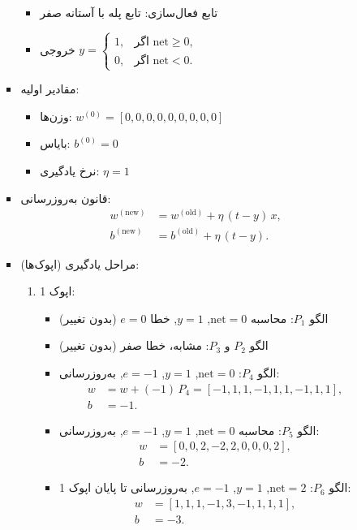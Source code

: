\begin{enumerate}
\begin{enumerate}
\begin{itemize}
\begin{itemize}
				\item تابع فعال‌سازی: تابع پله با آستانه صفر
				\item خروجی $y=\begin{cases}1,&\text{اگر }\mathrm{net}\ge0,\\0,&\text{اگر }\mathrm{net}<0.\end{cases}$
			\end{itemize}
			\item مقادیر اولیه:
			\begin{itemize}
				\item وزن‌ها: $w^{(0)}=[0,0,0,0,0,0,0,0,0]$
				\item بایاس: $b^{(0)}=0$
				\item نرخ یادگیری: $\eta=1$
			\end{itemize}
			\item قانون به‌روزرسانی:
			\begin{align*}
				w^{(\text{new})} &= w^{(\text{old})} + \eta\,(t - y)\,x,\\
				b^{(\text{new})} &= b^{(\text{old})} + \eta\,(t - y).
			\end{align*}
			\item مراحل یادگیری (اپوک‌ها):
			\begin{enumerate}
				\item اپوک 1:
				\begin{itemize}
					\item الگو $P_1$: محاسبه $\mathrm{net}=0$, $y=1$, خطا $e=0$ (بدون تغییر)
					\item الگو $P_2$ و $P_3$: مشابه، خطا صفر (بدون تغییر)
					\item الگو $P_4$: $\mathrm{net}=0$, $y=1$, $e=-1$, به‌روزرسانی:
					\begin{align*}
						w &= w + (-1)\,P_4 = [-1,1,1,-1,1,1,-1,1,1],\\
						b &= -1.
					\end{align*}
					\item الگو $P_5$: محاسبه $\mathrm{net}=0$, $y=1$, $e=-1$, به‌روزرسانی:
					\begin{align*}
						w &= [0,0,2,-2,2,0,0,0,2],\\
						b &= -2.
					\end{align*}
					\item الگو $P_6$: $\mathrm{net}=2$, $y=1$, $e=-1$, به‌روزرسانی تا پایان اپوک 1:
					\begin{align*}
						w &= [1,1,1,-1,3,-1,1,1,1],\\
						b &= -3.
					\end{align*}

\end{itemize}
\end{enumerate}
\end{itemize}
\end{enumerate}
\end{enumerate}
